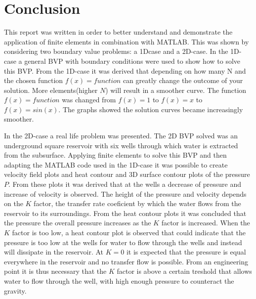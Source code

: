 \documentclass[a4paper]{report}
\begin{document}
\newpage
\chapter{Conclusion}

This report was written in order to better understand and demonstrate the application of finite elements in combination with MATLAB. This was shown by considering two boundary value problems: a 1Dcase and a 2D-case. In the 1D-case a general BVP with boundary conditions were used to show how to solve this BVP. From the 1D-case it was derived that depending on how many N and the chosen function $f(x) = function$ can greatly change the outcome of your solution. More elements(higher $N$) will result in a smoother curve. The function $f(x) = function$ was changed from $f(x) = 1$ to $f(x) = x$ to $f(x) = sin(x)$. The graphs showed the solution curves became increasingly smoother.\par 
In the 2D-case a real life problem was presented. The 2D BVP solved was an underground square reservoir with six wells through which water is extracted from the subsurface. Applying finite elements to solve this BVP and then adapting the MATLAB code used in the 1D-case it was possible to create velocity field plots and heat contour and 3D surface contour plots of the pressure $P$. From these plots it was derived that at the wells a decrease of pressure and increase of velocity is observed. The height of the pressure and velocity depends on the $K$ factor, the transfer rate coeficient by which the water flows from the reservoir to its surroundings. From the heat contour plots it was concluded that the pressure the overall pressure increases as the $K$ factor is increased. When the $K$ factor is too low, a heat contour plot is observed that could indicate that the pressure is too low at the wells for water to flow through the wells and instead will dissipate in the reservoir. At $K = 0$ it is expected that the pressure is equal everywhere in the reservoir and no transfer flow is possible. From an engineering point it is thus necessary that the $K$ factor is above a certain treshold that allows water to flow through the well, with high enough pressure to counteract the gravity.


\appendix
\end{document}
